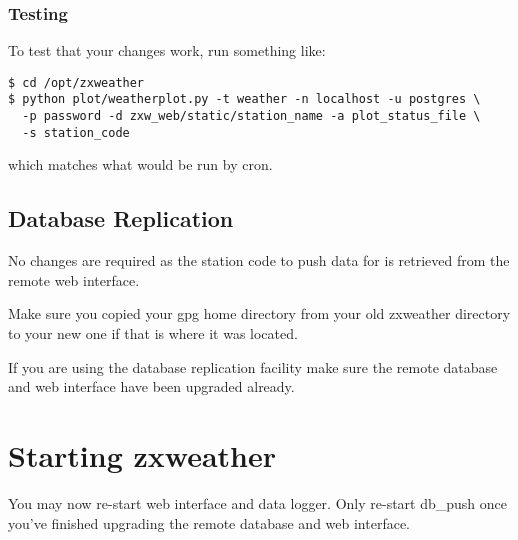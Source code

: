 \documentclass[a4paper,10pt,draft]{book}
\newcommand{\partnumber}{\ifthenelse{\isundefined{\projectnum}}{}{\projectnum-\docnum	\ifthenelse{\equal{\docrev}{001}}{}{.\docrev}}}
\newcommand*\cleartoleftpage{%
  \clearpage
  \ifodd\value{page}\hbox{}\newpage\fi
}
\begin{document}
\subsubsection{Testing}
To test that your changes work, run something like:
\begin{verbatim}
$ cd /opt/zxweather
$ python plot/weatherplot.py -t weather -n localhost -u postgres \
  -p password -d zxw_web/static/station_name -a plot_status_file \
  -s station_code
\end{verbatim}
which matches what would be run by cron.

\subsection{Database Replication}
No changes are required as the station code to push data for is retrieved from the remote web interface.

Make sure you copied your gpg home directory from your old zxweather directory to your new one if that is where it was located.

If you are using the database replication facility make sure the remote database and web interface have been upgraded already.

\section{Starting zxweather}
You may now re-start web interface and data logger. Only re-start db\_push once you've finished upgrading the remote database and web interface.


\cleartoleftpage
\thispagestyle{empty}
\begin{flushright}
\null
\vfill
\tt \partnumber
\end{flushright}
\end{document}
